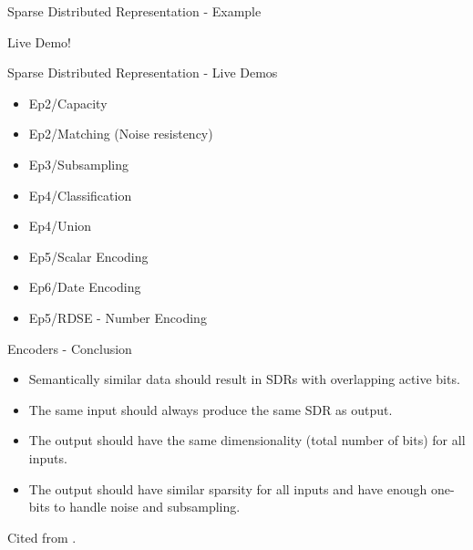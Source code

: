 \begin{frame}[c]{Sparse Distributed Representation - Example}
\end{frame}


\begin{frame}[c,standout]
    Live Demo!
\end{frame}


\begin{frame}[c]{Sparse Distributed Representation - Live Demos}
    \Large
    \begin{itemize}[<+(1)->]
        \item Ep2/Capacity
        \item Ep2/Matching (Noise resistency)
        \item Ep3/Subsampling
        \item Ep4/Classification
        \item Ep4/Union
        \item Ep5/Scalar Encoding
        \item Ep6/Date Encoding
        \item Ep5/RDSE - Number Encoding
    \end{itemize}
\end{frame}


\begin{frame}[c]{Encoders - Conclusion}
    \begin{itemize}[<+(1)->]
        \item Semantically similar data should result in SDRs with overlapping active bits.
        \item The same input should always produce the same SDR as output.
        \item The output should have the same dimensionality (total number of bits) for all inputs.
        \item The output should have similar sparsity for all inputs and have enough one-bits to handle noise and subsampling.
    \end{itemize}

    \normalsize
    \pause
    Cited from \cite{hawkins2016book}.
\end{frame}

